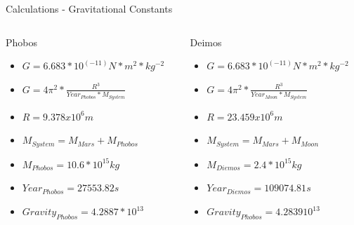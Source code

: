 \documentclass{beamer}  %
\begin{document}
\begin{frame}{Calculations - Gravitational Constants}

\begin{columns} %
 
 \begin{column}{0.50\textwidth} %
  \begin{block}{Phobos} %
   \begin{itemize}
   	\item $G = 6.683*10^(-11) N*m^2*kg^{-2}$
     \item $G = 4\pi ^{2}*\frac{R^{3}}{Year_{Phobos}*M_{System}}$
     \item $R =  9.378 x 10^6m$
	\item $M_{System} = M_{Mars} + M_{Phobos}$
	\item $M_{Phobos} = 10.6 * 10^{15} kg$
	\item $Year_{Phobos} = 27553.82 s$
	\item $Gravity_{Phobos} = 4.2887 * 10^{13}$
   \end{itemize}
  \end{block}
 \end{column}

 \begin{column}{0.50\textwidth} %
  \begin{block}{Deimos}
   \begin{itemize}
     \item $G = 6.683*10^(-11) N*m^2*kg^{-2}$
     \item $G = 4\pi ^{2}*\frac{R^{3}}{Year_{Moon}*M_{System}}$
     \item $R =  23.459 x 10^6m$
	\item $M_{System} = M_{Mars} + M_{Moon}$
	\item $M_{Diemos} = 2.4 * 10^{15} kg$
	\item $Year_{Diemos} = 109074.81 s$
	\item $Gravity_{Phobos} = 4.2839  10^{13}$
   \end{itemize}
  \end{block}
 \end{column}

\end{columns}

 \end{frame}
\end{document}
